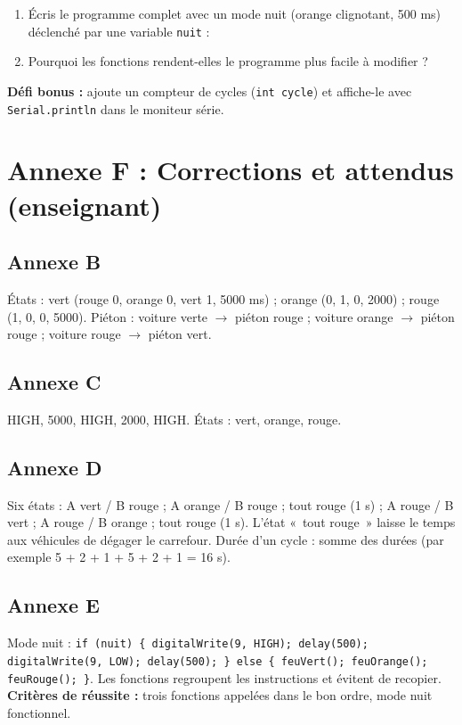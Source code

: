\documentclass[11pt,a4paper]{article}
\begin{document}
\begin{enumerate}
 \item Écris le programme complet avec un mode nuit (orange clignotant, 500 ms) déclenché par une variable \texttt{nuit} : \lig \lig \lig
 \item Pourquoi les fonctions rendent-elles le programme plus facile à modifier ? \dotfill
\end{enumerate}

\textbf{Défi bonus :} ajoute un compteur de cycles (\texttt{int cycle}) et affiche-le avec \texttt{Serial.println} dans le moniteur série.

\newpage
\section*{Annexe F : Corrections et attendus (enseignant)}

\subsection*{Annexe B}
États : vert (rouge 0, orange 0, vert 1, 5000 ms) ; orange (0, 1, 0, 2000) ; rouge (1, 0, 0, 5000). Piéton : voiture verte $\to$ piéton rouge ; voiture orange $\to$ piéton rouge ; voiture rouge $\to$ piéton vert.

\subsection*{Annexe C}
HIGH, 5000, HIGH, 2000, HIGH. États : vert, orange, rouge.

\subsection*{Annexe D}
Six états : A vert / B rouge ; A orange / B rouge ; tout rouge (1 s) ; A rouge / B vert ; A rouge / B orange ; tout rouge (1 s). L'état «~tout rouge~» laisse le temps aux véhicules de dégager le carrefour. Durée d'un cycle : somme des durées (par exemple 5 + 2 + 1 + 5 + 2 + 1 = 16 s).

\subsection*{Annexe E}
Mode nuit : \texttt{if (nuit) \{ digitalWrite(9, HIGH); delay(500); digitalWrite(9, LOW); delay(500); \} else \{ feuVert(); feuOrange(); feuRouge(); \}}. Les fonctions regroupent les instructions et évitent de recopier.\\
\textbf{Critères de réussite :} trois fonctions appelées dans le bon ordre, mode nuit fonctionnel.
\end{document}
